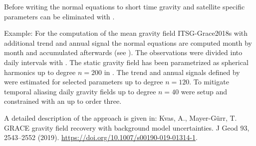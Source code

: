 Before writing the normal equations to 
short time gravity and satellite specific parameters can be eliminated with .

Example: For the computation of the mean gravity field ITSG-Grace2018s with additional trend and annual signal
the normal equations are computed month by month and accumulated afterwards (see ).
The observations were divided into daily intervals with .
The static gravity field has been parametrized as spherical harmonics
up to degree $n=200$ in .
The trend and annual signals defined by
were estimated for selected parameters up to degree $n=120$.
To mitigate temporal aliasing daily gravity fields up to degree $n=40$ were setup and constrained
with an  up to order three.

A detailed description of the approach is given in:
Kvas, A., Mayer-Gürr, T. GRACE gravity field recovery with background model uncertainties.
J Geod 93, 2543–2552 (2019). \url{https://doi.org/10.1007/s00190-019-01314-1}.


